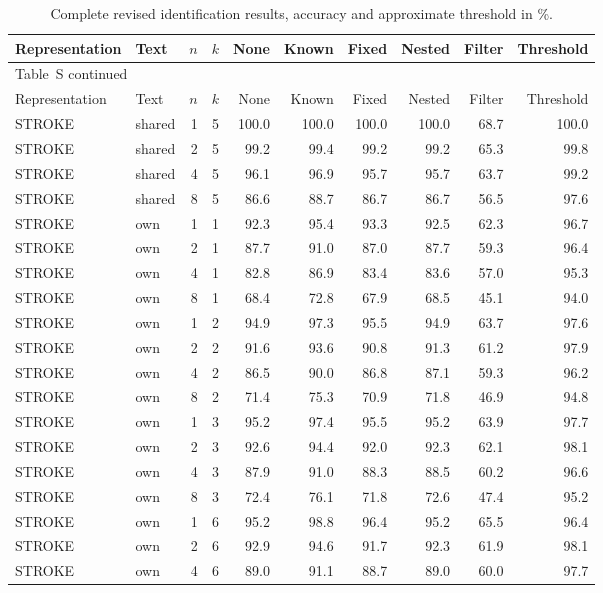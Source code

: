 \documentclass[10pt,a4paper]{article}
\renewcommand{\thetable}{S\arabic{table}}
\begin{document}
\small
\begin{longtable}{llrrrrrrrr}
\caption{Complete revised identification results, accuracy and approximate threshold in \%.}\label{tab:grid}\\
\toprule
Representation & Text & $n$ & $k$ & None & Known & Fixed & Nested & Filter & Threshold\\\midrule
\endfirsthead
\multicolumn{10}{l}{Table~\thetable{} continued}\\\toprule
Representation & Text & $n$ & $k$ & None & Known & Fixed & Nested & Filter & Threshold\\\midrule
\endhead
\bottomrule\endfoot
STROKE & shared & 1 & 5 & 100.0 & 100.0 & 100.0 & 100.0 & 68.7 & 100.0 \\
STROKE & shared & 2 & 5 & 99.2 & 99.4 & 99.2 & 99.2 & 65.3 & 99.8 \\
STROKE & shared & 4 & 5 & 96.1 & 96.9 & 95.7 & 95.7 & 63.7 & 99.2 \\
STROKE & shared & 8 & 5 & 86.6 & 88.7 & 86.7 & 86.7 & 56.5 & 97.6 \\
STROKE & own & 1 & 1 & 92.3 & 95.4 & 93.3 & 92.5 & 62.3 & 96.7 \\
STROKE & own & 2 & 1 & 87.7 & 91.0 & 87.0 & 87.7 & 59.3 & 96.4 \\
STROKE & own & 4 & 1 & 82.8 & 86.9 & 83.4 & 83.6 & 57.0 & 95.3 \\
STROKE & own & 8 & 1 & 68.4 & 72.8 & 67.9 & 68.5 & 45.1 & 94.0 \\
STROKE & own & 1 & 2 & 94.9 & 97.3 & 95.5 & 94.9 & 63.7 & 97.6 \\
STROKE & own & 2 & 2 & 91.6 & 93.6 & 90.8 & 91.3 & 61.2 & 97.9 \\
STROKE & own & 4 & 2 & 86.5 & 90.0 & 86.8 & 87.1 & 59.3 & 96.2 \\
STROKE & own & 8 & 2 & 71.4 & 75.3 & 70.9 & 71.8 & 46.9 & 94.8 \\
STROKE & own & 1 & 3 & 95.2 & 97.4 & 95.5 & 95.2 & 63.9 & 97.7 \\
STROKE & own & 2 & 3 & 92.6 & 94.4 & 92.0 & 92.3 & 62.1 & 98.1 \\
STROKE & own & 4 & 3 & 87.9 & 91.0 & 88.3 & 88.5 & 60.2 & 96.6 \\
STROKE & own & 8 & 3 & 72.4 & 76.1 & 71.8 & 72.6 & 47.4 & 95.2 \\
STROKE & own & 1 & 6 & 95.2 & 98.8 & 96.4 & 95.2 & 65.5 & 96.4 \\
STROKE & own & 2 & 6 & 92.9 & 94.6 & 91.7 & 92.3 & 61.9 & 98.1 \\
STROKE & own & 4 & 6 & 89.0 & 91.1 & 88.7 & 89.0 & 60.0 & 97.7 \\

\end{longtable}
\end{document}
